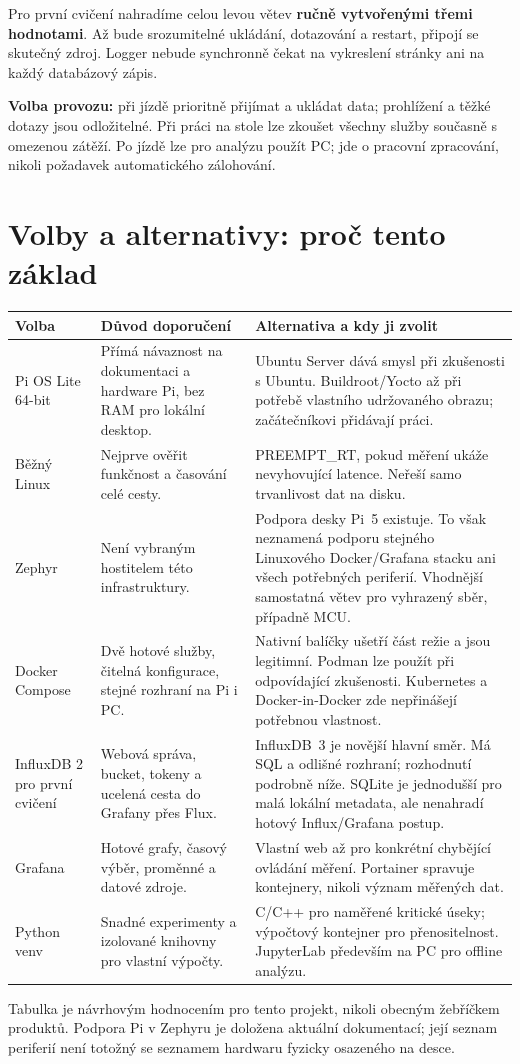 \documentclass[11pt,a4paper]{article}
\begin{document}
Pro první cvičení nahradíme celou levou větev \textbf{ručně vytvořenými třemi hodnotami}. Až bude srozumitelné ukládání, dotazování a restart, připojí se skutečný zdroj. Logger nebude synchronně čekat na vykreslení stránky ani na každý databázový zápis.

\textbf{Volba provozu:} při jízdě prioritně přijímat a ukládat data; prohlížení a těžké dotazy jsou odložitelné. Při práci na stole lze zkoušet všechny služby současně s omezenou zátěží. Po jízdě lze pro analýzu použít PC; jde o pracovní zpracování, nikoli požadavek automatického zálohování.

\clearpage
\section{Volby a alternativy: proč tento základ}
\small
\begin{longtable}{@{}L{33mm}L{57mm}L{60mm}@{}}
\toprule Volba & Důvod doporučení & Alternativa a kdy ji zvolit\\\midrule\endhead
Pi OS Lite 64-bit & Přímá návaznost na dokumentaci a hardware Pi, bez RAM pro lokální desktop. & Ubuntu Server dává smysl při zkušenosti s Ubuntu. Buildroot/Yocto až při potřebě vlastního udržovaného obrazu; začátečníkovi přidávají práci.\\\addlinespace
Běžný Linux & Nejprve ověřit funkčnost a časování celé cesty. & PREEMPT\_RT, pokud měření ukáže nevyhovující latence. Neřeší samo trvanlivost dat na disku.\\\addlinespace
Zephyr & Není vybraným hostitelem této infrastruktury. & Podpora desky Pi~5 existuje. To však neznamená podporu stejného Linuxového Docker/Grafana stacku ani všech potřebných periferií. Vhodnější samostatná větev pro vyhrazený sběr, případně MCU.\\\addlinespace
Docker Compose & Dvě hotové služby, čitelná konfigurace, stejné rozhraní na Pi i PC. & Nativní balíčky ušetří část režie a jsou legitimní. Podman lze použít při odpovídající zkušenosti. Kubernetes a Docker-in-Docker zde nepřinášejí potřebnou vlastnost.\\\addlinespace
InfluxDB 2 pro první cvičení & Webová správa, bucket, tokeny a ucelená cesta do Grafany přes Flux. & InfluxDB~3 je novější hlavní směr. Má SQL a odlišné rozhraní; rozhodnutí podrobně níže. SQLite je jednodušší pro malá lokální metadata, ale nenahradí hotový Influx/Grafana postup.\\\addlinespace
Grafana & Hotové grafy, časový výběr, proměnné a datové zdroje. & Vlastní web až pro konkrétní chybějící ovládání měření. Portainer spravuje kontejnery, nikoli význam měřených dat.\\\addlinespace
Python venv & Snadné experimenty a izolované knihovny pro vlastní výpočty. & C/C++ pro naměřené kritické úseky; výpočtový kontejner pro přenositelnost. JupyterLab především na PC pro offline analýzu.\\
\bottomrule
\end{longtable}
\normalsize
Tabulka je návrhovým hodnocením pro tento projekt, nikoli obecným žebříčkem produktů. Podpora Pi v Zephyru je doložena aktuální dokumentací; její seznam periferií není totožný se seznamem hardwaru fyzicky osazeného na desce.\cite{pi-start,zephyr,venv,sqlite}
\end{document}
